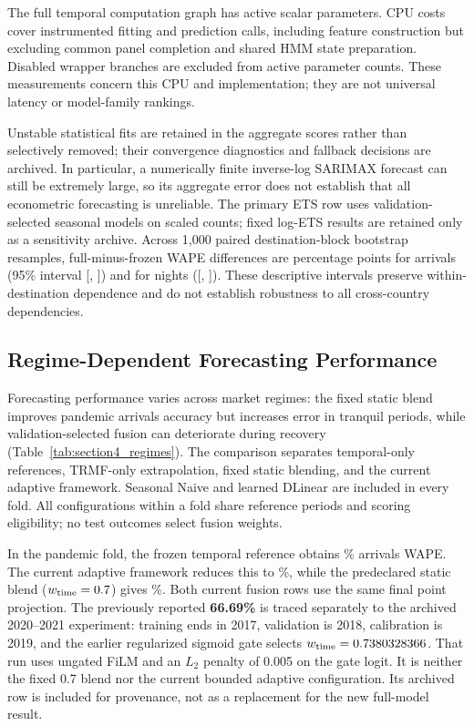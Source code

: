 \documentclass[sigconf]{acmart}
\begin{document}


The full temporal computation graph has \ResultFullParameters{} active scalar parameters. CPU costs cover instrumented fitting and prediction calls, including feature construction but excluding common panel completion and shared HMM state preparation. Disabled wrapper branches are excluded from active parameter counts. These measurements concern this CPU and implementation; they are not universal latency or model-family rankings.

Unstable statistical fits are retained in the aggregate scores rather than selectively removed; their convergence diagnostics and fallback decisions are archived. In particular, a numerically finite inverse-log SARIMAX forecast can still be extremely large, so its aggregate error does not establish that all econometric forecasting is unreliable. The primary ETS row uses validation-selected seasonal models on scaled counts; fixed log-ETS results are retained only as a sensitivity archive. Across 1,000 paired destination-block bootstrap resamples, full-minus-frozen WAPE differences are \ResultDeltaArr{} percentage points for arrivals (95\% interval [\ResultLowerArr, \ResultUpperArr]) and \ResultDeltaNig{} for nights ([\ResultLowerNig, \ResultUpperNig]). These descriptive intervals preserve within-destination dependence and do not establish robustness to all cross-country dependencies.

\subsection{Regime-Dependent Forecasting Performance}
\label{sec:regime_performance}
Forecasting performance varies across market regimes: the fixed static blend improves pandemic arrivals accuracy but increases error in tranquil periods, while validation-selected fusion can deteriorate during recovery (Table~\ref{tab:section4_regimes}). The comparison separates temporal-only references, TRMF-only extrapolation, fixed static blending, and the current adaptive framework. Seasonal Naive and learned DLinear are included in every fold. All configurations within a fold share reference periods and scoring eligibility; no test outcomes select fusion weights.



In the pandemic fold, the frozen temporal reference obtains \ResultFrozenShockArr\% arrivals WAPE. The current adaptive framework reduces this to \ResultAdaptiveShockArr\%, while the predeclared static blend ($w_{\rm time}=0.7$) gives \ResultStaticShockArr\%. Both current fusion rows use the same final point projection. The previously reported \textbf{66.69\%} is traced separately to the archived 2020--2021 experiment: training ends in 2017, validation is 2018, calibration is 2019, and the earlier regularized sigmoid gate selects $w_{\rm time}=0.7380328366$. That run uses ungated FiLM and an $L_2$ penalty of 0.005 on the gate logit. It is neither the fixed 0.7 blend nor the current bounded adaptive configuration. Its archived row is included for provenance, not as a replacement for the new full-model result.
\end{document}
